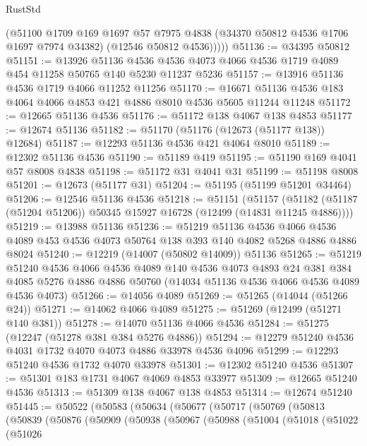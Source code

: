 \begin{lexlean}{RustStd}
\begin{coremodule}
          (@51100
            @1709
            @169
            @1697
            @57
            @7975
            @4838
            (@34370 @50812 @4536 @1706 @1697 @7974 @34382)
            (@12546 @50812 @4536)))))
@51136 := @34395 @50812
@51151 := @13926
    @51136
    @4536
    @4536
    @4073
    @4066
    @4536
    @1719
    @4089
    @454
    @11258
    @50765
    @140
    @5230
    @11237
    @5236
@51157 := @13916 @51136 @4536 @1719 @4066 @11252 @11256
@51170 := @16671 @51136 @4536 @183 @4064 @4066 @4853 @421 @4886 @8010 @4536 @5605 @11244 @11248
@51172 := @12665 @51136 @4536
@51176 := @51172 @138 @4067 @138 @4853
@51177 := @12674 @51136
@51182 := @51170 (@51176 (@12673 (@51177 @138)) @12684)
@51187 := @12293 @51136 @4536 @421 @4064 @8010
@51189 := @12302 @51136 @4536
@51190 := @51189 @419
@51195 := @51190 @169 @4041 @57 @8008 @4838
@51198 := @51172 @31 @4041 @31
@51199 := @51198 @8008
@51201 := @12673 (@51177 @31)
@51204 := @51195 (@51199 @51201 @34464)
@51206 := @12546 @51136 @4536
@51218 := @51151
    (@51157 (@51182 (@51187 (@51204 @51206)) @50345 @15927 @16728 (@12499 (@14831 @11245 @4886))))
@51219 := @13988 @51136
@51236 := @51219
    @51136
    @4536
    @4066
    @4536
    @4089
    @453
    @4536
    @4073
    @50764
    @138
    @393
    @140
    @4082
    @5268
    @4886
    @4886
    @8024
@51240 := @12219 (@14007 (@50802 @14009)) @51136
@51265 := @51219
    @51240
    @4536
    @4066
    @4536
    @4089
    @140
    @4536
    @4073
    @4893
    @24
    @381
    @384
    @4085
    @5276
    @4886
    @4886
    @50760
    (@14034 @51136 @4536 @4066 @4536 @4089 @4536 @4073)
@51266 := @14056 @4089
@51269 := @51265 (@14044 (@51266 @24))
@51271 := @14062 @4066 @4089
@51275 := @51269 (@12499 (@51271 @140 @381))
@51278 := @14070 @51136 @4066 @4536
@51284 := @51275 (@12247 (@51278 @381 @384 @5276 @4886))
@51294 := @12279 @51240 @4536 @4031 @1732 @4070 @4073 @4886 @33978 @4536 @4096
@51299 := @12293 @51240 @4536 @1732 @4070 @33978
@51301 := @12302 @51240 @4536
@51307 := @51301 @183 @1731 @4067 @4069 @4853 @33977
@51309 := @12665 @51240 @4536
@51313 := @51309 @138 @4067 @138 @4853
@51314 := @12674 @51240
@51445 := @50522
    (@50583
      (@50634
        (@50677
          (@50717
            (@50769
              (@50813
                (@50839
                  (@50876
                    (@50909
                      (@50938
                        (@50967
                          (@50988
                            (@51004
                              (@51018
                                (@51022
                                  (@51026

\end{coremodule}
\end{lexlean}
